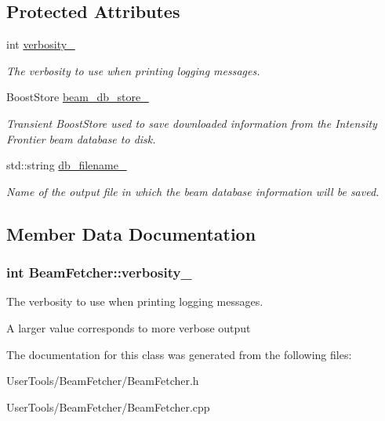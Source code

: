 \subsection*{Protected Attributes}
\begin{DoxyCompactItemize}
\item 
int \hyperlink{classBeamFetcher_ab78e5092f1cd5b0544fe6b587282c968}{verbosity\-\_\-}
\begin{DoxyCompactList}\small\item\em The verbosity to use when printing logging messages. \end{DoxyCompactList}\item 
\hypertarget{classBeamFetcher_ac9e8e1c53a2f06c00be83258be22400d}{Boost\-Store \hyperlink{classBeamFetcher_ac9e8e1c53a2f06c00be83258be22400d}{beam\-\_\-db\-\_\-store\-\_\-}}\label{classBeamFetcher_ac9e8e1c53a2f06c00be83258be22400d}

\begin{DoxyCompactList}\small\item\em Transient Boost\-Store used to save downloaded information from the Intensity Frontier beam database to disk. \end{DoxyCompactList}\item 
\hypertarget{classBeamFetcher_a6e37759beec5bc578d7d4de539329bce}{std\-::string \hyperlink{classBeamFetcher_a6e37759beec5bc578d7d4de539329bce}{db\-\_\-filename\-\_\-}}\label{classBeamFetcher_a6e37759beec5bc578d7d4de539329bce}

\begin{DoxyCompactList}\small\item\em Name of the output file in which the beam database information will be saved. \end{DoxyCompactList}\end{DoxyCompactItemize}


\subsection{Member Data Documentation}
\hypertarget{classBeamFetcher_ab78e5092f1cd5b0544fe6b587282c968}{
\subsubsection[{verbosity\-\_\-}]{\setlength{\rightskip}{0pt plus 5cm}int Beam\-Fetcher\-::verbosity\-\_\-\hspace{0.3cm}{\ttfamily [protected]}}}\label{classBeamFetcher_ab78e5092f1cd5b0544fe6b587282c968}


The verbosity to use when printing logging messages. 

A larger value corresponds to more verbose output 

The documentation for this class was generated from the following files\-:\begin{DoxyCompactItemize}
\item 
User\-Tools/\-Beam\-Fetcher/Beam\-Fetcher.\-h\item 
User\-Tools/\-Beam\-Fetcher/Beam\-Fetcher.\-cpp\end{DoxyCompactItemize}
